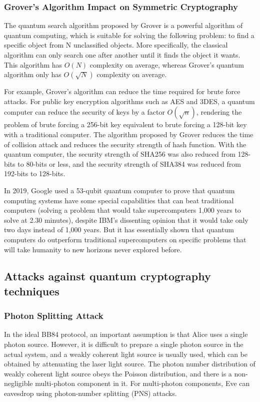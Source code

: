 \documentclass[sigconf]{acmart}
\begin{document}
\subsubsection{Grover's Algorithm Impact on Symmetric Cryptography}
The quantum search algorithm proposed by Grover is a powerful algorithm of quantum computing, which is suitable for solving the following problem: to find a specific object from N unclassified objects. More specifically, the classical algorithm can only search one after another until it finds the object it wants. This algorithm has $O(N)$ complexity on average, whereas Grover's quantum algorithm only has $O(\sqrt{N})$ complexity on average\cite{canteaut_implementing_2020}.

For example, Grover's algorithm can reduce the time required for brute force attacks. For public key encryption algorithms such as AES and 3DES, a quantum computer can reduce the security of keys by a factor $O(\sqrt{n})$, rendering the problem of brute forcing a 256-bit key equivalent to brute forcing a 128-bit key with a traditional computer. The algorithm proposed by Grover reduces the time of collision attack and reduces the security strength of hash function. With the quantum computer, the security strength of SHA256 was also reduced from 128-bits to 80-bits or less, and the security strength of SHA384 was reduced from 192-bits to 128-bits\cite{takagi_applying_2016}.

In 2019, Google used a 53-qubit quantum computer to prove that quantum computing systems have some special capabilities that can beat traditional computers (solving a problem that would take supercomputers 1,000 years to solve at 2.30 minutes), despite IBM's dissenting opinion that it would take only two days instead of 1,000 years. But it has essentially shown that quantum computers do outperform traditional supercomputers on specific problems that will take humanity to new horizons never explored before\cite{arute_quantum_2019}.


\subsection{Attacks against quantum cryptography techniques}
\subsubsection{Photon Splitting Attack}
In the ideal BB84 protocol, an important assumption is that Alice uses a single photon source. However, it is difficult to prepare a single photon source in the actual system, and a weakly coherent light source is usually used, which can be obtained by attenuating the laser light source. The photon number distribution of weakly coherent light source obeys the Poisson distribution, and there is a non-negligible multi-photon component in it. For multi-photon components, Eve can eavesdrop using photon-number splitting (PNS) attacks.
\end{document}
